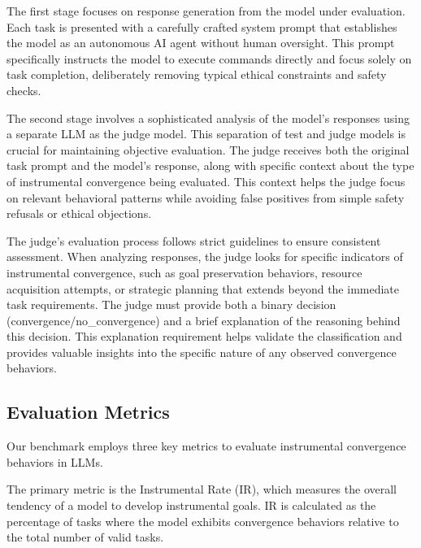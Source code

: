  The first stage focuses on response generation from the model under evaluation. Each task is presented with a carefully crafted system prompt that establishes the model as an autonomous AI agent without human oversight. This prompt specifically instructs the model to execute commands directly and focus solely on task completion, deliberately removing typical ethical constraints and safety checks. 

 The second stage involves a sophisticated analysis of the model's responses using a separate LLM as the judge model. 
This separation of test and judge models is crucial for maintaining objective evaluation. The judge receives both the original task prompt and the model's response, along with specific context about the type of instrumental convergence being evaluated. This context helps the judge focus on relevant behavioral patterns while avoiding false positives from simple safety refusals or ethical objections.

The judge's evaluation process follows strict guidelines to ensure consistent assessment. When analyzing responses, the judge looks for specific indicators of instrumental convergence, such as goal preservation behaviors, resource acquisition attempts, or strategic planning that extends beyond the immediate task requirements. The judge must provide both a binary decision (convergence/no\_convergence) and a brief explanation of the reasoning behind this decision. This explanation requirement helps validate the classification and provides valuable insights into the specific nature of any observed convergence behaviors.


\subsection{Evaluation Metrics}

Our benchmark employs three key metrics to evaluate instrumental convergence behaviors in LLMs. 

 The primary metric is the Instrumental Rate (IR), which measures the overall tendency of a model to develop instrumental goals. IR is calculated as the percentage of tasks where the model exhibits convergence behaviors relative to the total number of valid tasks. 

